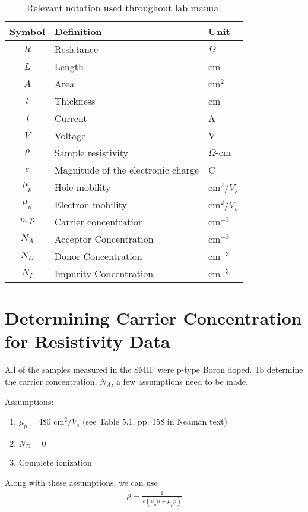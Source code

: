 \documentclass[12pt]{../manual}
\begin{document}
\begin{table}[ht!]
\caption{Relevant notation used throughout lab manual}
\centering
\begin{tabular}{|c|l|l|} \hline
Symbol 	& Definition							& Unit		\\ \hline
$R$ 	& Resistance 							& $\Omega$	\\ \hline
$L$		& Length								& cm		\\ \hline
$A$		& Area									& cm$^2$	\\ \hline
$t$		& Thickness								& cm		\\ \hline
$I$		& Current								& A			\\ \hline
$V$		& Voltage								& V			\\ \hline	
$\rho$ 	& Sample resistivity 					& $\Omega \mbox{-cm}$ \\ \hline
$e$ 	& Magnitude of the electronic charge 	& C 		\\ \hline
$\mu_p$ & Hole mobility 						& cm$^2 / V_s$ \\ \hline
$\mu_n$ & Electron mobility 					& cm$^2 / V_s$ \\ \hline
$n,p$ 	& Carrier concentration 				& cm$^{-3}$	\\ \hline
$N_A$	& Acceptor Concentration 				& cm$^{-3}$	\\ \hline
$N_D$ 	& Donor Concentration 					& cm$^{-3}$	\\ \hline
$N_I$	& Impurity Concentration 				& cm$^{-3}$	\\ \hline
\end{tabular}
\end{table}

\newpage
\section{Determining Carrier Concentration for Resistivity Data}

All of the samples measured in the SMIF were p-type Boron doped.  To determine the carrier concentration, $N_A$, a few assumptions need to be made.  

Assumptions:
\begin{enumerate}
\item $\mu_p = 480 \mbox{ cm}^2/V_s$ (see Table 5.1, pp. 158 in Neaman text)
\item $N_D=0$
\item Complete ionization 
\end{enumerate}

Along with these assumptions, we can use
\begin{align}
\rho = \frac{1}{e(\mu_nn + \mu_pp)}
\end{align}
\end{document}
